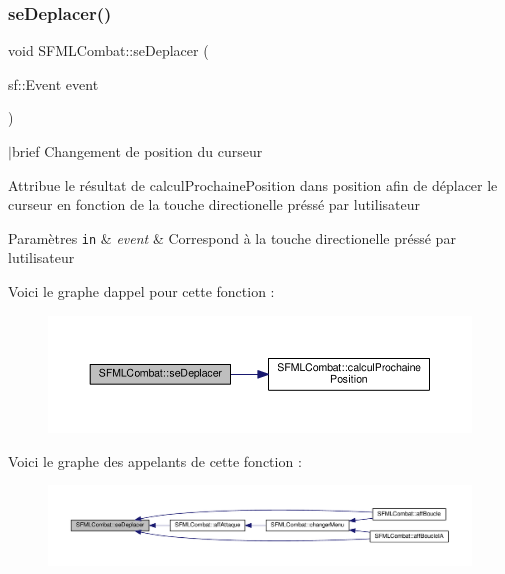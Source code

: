 \subsubsection{\texorpdfstring{se\+Deplacer()}{seDeplacer()}}
{\footnotesize\ttfamily void S\+F\+M\+L\+Combat\+::se\+Deplacer (\begin{DoxyParamCaption}\item[{sf\+::\+Event}]{event }\end{DoxyParamCaption})\hspace{0.3cm}{\ttfamily [private]}}

$\vert$brief Changement de position du curseur

Attribue le résultat de calcul\+Prochaine\+Position dans position afin de déplacer le curseur en fonction de la touche directionelle préssé par l\textquotesingle{}utilisateur 
\begin{DoxyParams}[1]{Paramètres}
\mbox{\tt in}  & {\em event} & Correspond à la touche directionelle préssé par l\textquotesingle{}utilisateur \\
\hline
\end{DoxyParams}
Voici le graphe d\textquotesingle{}appel pour cette fonction \+:\nopagebreak
\begin{figure}[H]
\begin{center}
\leavevmode
\includegraphics[width=350pt]{class_s_f_m_l_combat_a796b43eec3296bc9d66e2618069f5abe_cgraph}
\end{center}
\end{figure}
Voici le graphe des appelants de cette fonction \+:\nopagebreak
\begin{figure}[H]
\begin{center}
\leavevmode
\includegraphics[width=350pt]{class_s_f_m_l_combat_a796b43eec3296bc9d66e2618069f5abe_icgraph}
\end{center}
\end{figure}
\mbox{\label{class_s_f_m_l_combat_ac41423229acd874f68463a462fdfce08}} 
